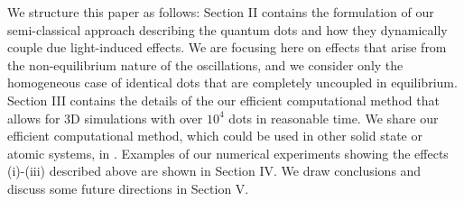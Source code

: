 We structure this paper as follows: Section II contains the formulation of our semi-classical approach describing the quantum dots and how they dynamically couple due light-induced effects.
We are focusing here on effects that arise from the non-equilibrium nature of the oscillations, and we consider only the homogeneous case of identical dots that are completely uncoupled in equilibrium.
Section III contains the details of the our efficient computational method that allows for 3D simulations with over $10^4$ dots in reasonable time.
We share our efficient computational method, which could be used in other solid state or atomic systems, in \cite{githubpage}.
Examples of our numerical experiments showing the effects (i)-(iii) described above are shown in Section IV.
We draw conclusions and discuss some future directions in Section V.

